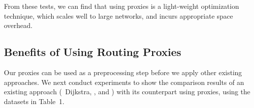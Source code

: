 From these tests, we can find that using proxies is a light-weight optimization technique, which scales well to large networks, and incurs appropriate space overhead. %

\subsection{Benefits of Using Routing Proxies}
Our proxies can be used as a preprocessing step before we apply other existing approaches.
We next conduct experiments to show the comparison results of an existing approach (\ie \ Dijkstra, \arcflag, \tnr and \ah) with its counterpart using proxies, using the datasets in Table~1.


